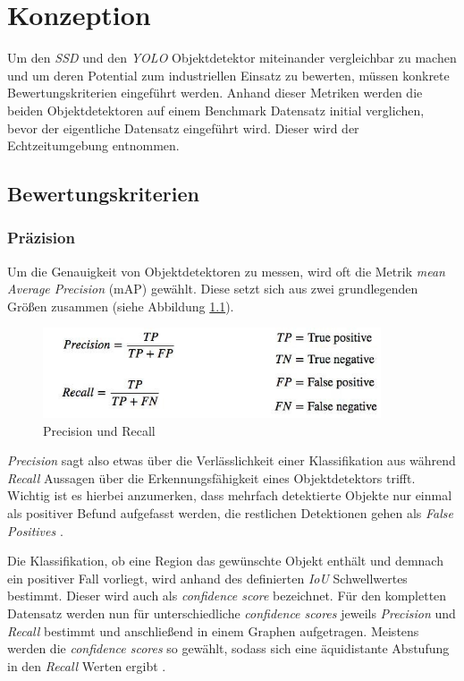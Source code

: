 \chapter{Konzeption}

Um den \textit{SSD} und den \textit{YOLO} Objektdetektor miteinander vergleichbar zu machen und um deren Potential zum industriellen Einsatz zu bewerten, müssen konkrete Bewertungskriterien eingeführt werden. Anhand dieser Metriken werden die beiden Objektdetektoren auf einem Benchmark Datensatz initial verglichen, bevor der eigentliche Datensatz eingeführt wird. Dieser wird der Echtzeitumgebung entnommen. 

\section{Bewertungskriterien}

\subsection*{Präzision}

Um die Genauigkeit von Objektdetektoren zu messen, wird oft die Metrik \textit{mean Average Precision} (mAP) gewählt. Diese setzt sich aus zwei grundlegenden Größen zusammen (siehe Abbildung \ref{metrics}). 

\begin{figure}[ht]
	\begin{center}
		\includegraphics[width=10cm]{Bilder/metrics.png} 
		\caption[Precision und Recall Metrik]{Precision und Recall \cite{JonathanHui.20180307}}
		\label{metrics}
	\end{center}
\end{figure}

\textit{Precision} sagt also etwas über die Verlässlichkeit einer Klassifikation aus während \textit{Recall} Aussagen über die Erkennungsfähigkeit eines Objektdetektors trifft. Wichtig ist es hierbei anzumerken, dass mehrfach detektierte Objekte nur einmal als positiver Befund aufgefasst werden, die restlichen Detektionen gehen als \textit{False Positives} \cite{TarangShah.20180127}.

Die Klassifikation, ob eine Region das gewünschte Objekt enthält und demnach ein positiver Fall vorliegt, wird anhand des definierten \textit{IoU} Schwellwertes bestimmt. Dieser wird auch als \textit{confidence score} bezeichnet. Für den kompletten Datensatz werden nun für unterschiedliche \textit{confidence scores} jeweils \textit{Precision} und \textit{Recall} bestimmt und anschließend in einem Graphen aufgetragen. Meistens werden die \textit{confidence scores} so gewählt, sodass sich eine äquidistante Abstufung in den \textit{Recall} Werten ergibt \cite{TarangShah.20180127}. 

